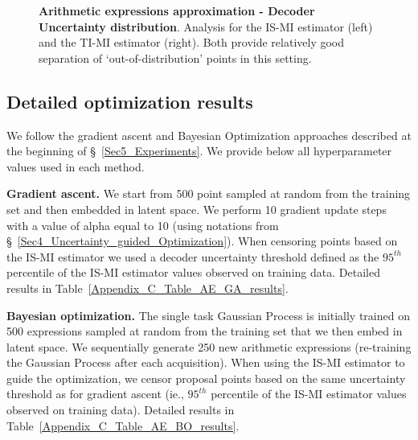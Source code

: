 \begin{figure}[ht]
\vspace{0pt}
\hfill
{}
\caption{\textbf{Arithmetic expressions approximation - Decoder Uncertainty distribution}. Analysis for the IS-MI estimator (left) and the TI-MI estimator (right). Both provide relatively good separation of `out-of-distribution' points in this setting.}
\label{Appendix_C_Fig_decoder_uncertainty_estimator}
\end{figure}

\subsection{Detailed optimization results}
\label{Appendix_C.4_Arithmetic_expression_Optimization}
We follow the gradient ascent and Bayesian Optimization approaches described at the beginning of \S~\ref{Sec5_Experiments}. We provide below all hyperparameter values used in each method.

\textbf{Gradient ascent.} We start from 500 point sampled at random from the training set and then embedded in latent space. We perform 10 gradient update steps with a value of alpha equal to 10 (using notations from \S~\ref{Sec4_Uncertainty_guided_Optimization}). When censoring points based on the IS-MI estimator we used a decoder uncertainty threshold defined as the $95^{th}$ percentile of the IS-MI estimator values observed on training data. Detailed results in Table~\ref{Appendix_C_Table_AE_GA_results}. 



\textbf{Bayesian optimization.} The single task Gaussian Process is initially trained on 500 expressions sampled at random from the training set that we then embed in latent space. We sequentially generate 250 new arithmetic expressions (re-training the Gaussian Process after each acquisition). When using the IS-MI estimator to guide the optimization, we censor proposal points based on the same uncertainty threshold as for gradient ascent (ie., $95^{th}$ percentile of the IS-MI estimator values observed on training data). Detailed results in Table~\ref{Appendix_C_Table_AE_BO_results}.



